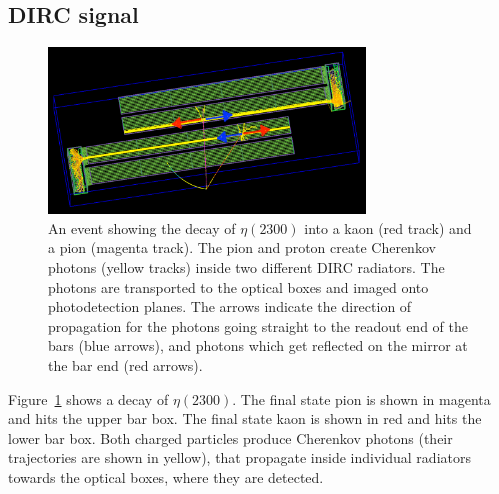 \subsection{DIRC signal}

\begin{figure}[h]
\centering
\includegraphics[width=0.75\textwidth]{pics/dir_ref.png}%
\caption{\label{pic:eta2300}
An event showing the decay of $\eta(2300)$ into a kaon (red track) and a pion (magenta track). 
The pion and proton create Cherenkov photons (yellow tracks) inside two different DIRC radiators. The photons are transported to the optical boxes and imaged onto photodetection planes. The arrows indicate the direction of propagation for the photons going straight to the readout end of the bars (blue arrows), and photons which get reflected on the mirror at the bar end (red arrows). 
}
\end{figure}

Figure~\ref{pic:eta2300} shows a decay of $\eta(2300)$. The final state pion is shown in magenta and hits the upper bar box. The final state kaon is shown in red and hits the lower bar box. Both charged particles produce Cherenkov photons (their trajectories are shown in yellow), that propagate inside individual radiators towards the optical boxes, where they are detected. 

